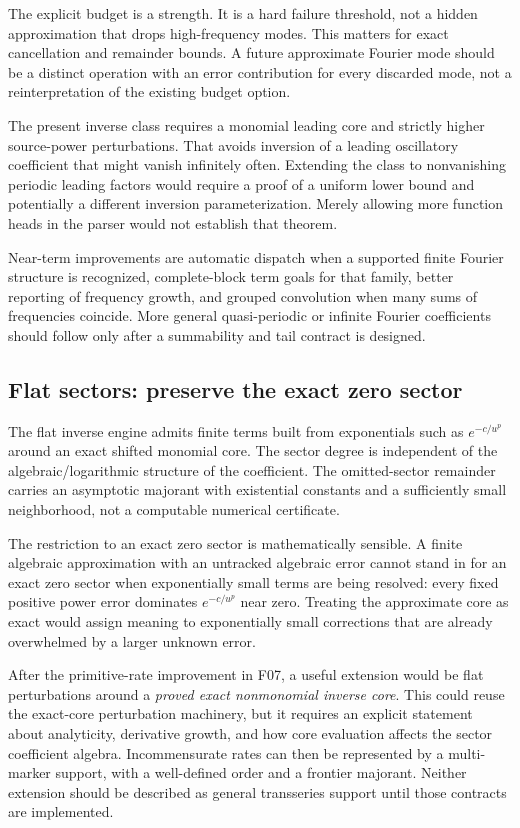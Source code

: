 \documentclass[11pt,a4paper]{article}
\newcommand{\code}[1]{\texttt{\detokenize{#1}}}
\theoremstyle{definition}
\begin{document}
The explicit \code{"MaxFrequencies"} budget is a strength. It is a hard failure threshold, not a hidden approximation that drops high-frequency modes. This matters for exact cancellation and remainder bounds. A future approximate Fourier mode should be a distinct operation with an error contribution for every discarded mode, not a reinterpretation of the existing budget option.

The present inverse class requires a monomial leading core and strictly higher source-power perturbations. That avoids inversion of a leading oscillatory coefficient that might vanish infinitely often. Extending the class to nonvanishing periodic leading factors would require a proof of a uniform lower bound and potentially a different inversion parameterization. Merely allowing more function heads in the parser would not establish that theorem.

Near-term improvements are automatic dispatch when a supported finite Fourier structure is recognized, complete-block term goals for that family, better reporting of frequency growth, and grouped convolution when many sums of frequencies coincide. More general quasi-periodic or infinite Fourier coefficients should follow only after a summability and tail contract is designed.

\subsection{Flat sectors: preserve the exact zero sector}

The flat inverse engine admits finite terms built from exponentials such as $e^{-c/u^p}$ around an exact shifted monomial core. The sector degree is independent of the algebraic/logarithmic structure of the coefficient. The omitted-sector remainder carries an asymptotic majorant with existential constants and a sufficiently small neighborhood, not a computable numerical certificate.\cite{flat}

The restriction to an exact zero sector is mathematically sensible. A finite algebraic approximation with an untracked algebraic error cannot stand in for an exact zero sector when exponentially small terms are being resolved: every fixed positive power error dominates $e^{-c/u^p}$ near zero. Treating the approximate core as exact would assign meaning to exponentially small corrections that are already overwhelmed by a larger unknown error.

After the primitive-rate improvement in F07, a useful extension would be flat perturbations around a \emph{proved exact nonmonomial inverse core}. This could reuse the exact-core perturbation machinery, but it requires an explicit statement about analyticity, derivative growth, and how core evaluation affects the sector coefficient algebra. Incommensurate rates can then be represented by a multi-marker support, with a well-defined order and a frontier majorant. Neither extension should be described as general transseries support until those contracts are implemented.
\end{document}
